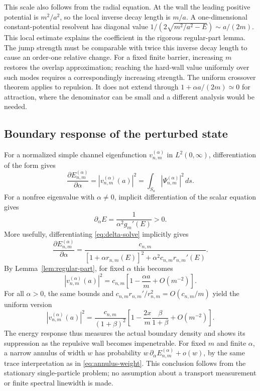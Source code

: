 \documentclass[12pt,a4paper]{article}
\numberwithin{equation}{section}
\theoremstyle{remark}
\theoremstyle{definition}
\begin{document}
This scale also follows from the radial equation. At the wall the leading
positive potential is $m^2/a^2$, so the local inverse decay length is
$m/a$. A one-dimensional constant-potential resolvent has diagonal value
$1/(2\sqrt{m^2/a^2-E})\sim a/(2m)$. This local estimate explains the
coefficient in the rigorous regular-part lemma. The jump strength must
be comparable with twice this inverse decay length to cause an order-one
relative change. For a fixed finite barrier, increasing $m$ restores the
overlap approximation; reaching the hard-wall value uniformly over such
modes requires a correspondingly increasing strength. The uniform
crossover theorem applies to repulsion. It does not extend through
$1+\alpha a/(2m)\simeq0$ for attraction, where the denominator can be
small and a different analysis would be needed.

\subsection{Boundary response of the perturbed state}

For a normalized simple channel eigenfunction $v_{n,m}^{(\alpha)}$ in
$L^2(0,\infty)$, differentiation of the form gives
\begin{equation}\label{eq:HF}
\frac{\partial E_{n,m}^{(\alpha)}}{\partial\alpha}
=|v_{n,m}^{(\alpha)}(a)|^2
=\int_{S_a}|\Psi_{n,m}^{(\alpha)}|^2\,ds.
\end{equation}
For a nonfree eigenvalue with $\alpha\ne0$, implicit differentiation of
the scalar equation gives
$$
\partial_\alpha E=\frac{1}{\alpha^2g_m'(E)}>0.
$$
More usefully, differentiating
\eqref{eq:delta-solve} implicitly gives
\begin{equation}\label{eq:boundary-response}
\frac{\partial E_{n,m}^{(\alpha)}}{\partial\alpha}
=\frac{c_{n,m}}
{[1+\alpha r_{n,m}(E)]^2+\alpha^2c_{n,m}r_{n,m}'(E)}.
\end{equation}
By Lemma~\ref{lem:regular-part}, for fixed $\alpha$ this becomes
$$
|v_{n,m}^{(\alpha)}(a)|^2
=c_{n,m}\left[1-\frac{\alpha a}{m}+O(m^{-2})\right].
$$
For all $\alpha>0$, the same bounds and
$c_{n,m}r_{n,m}'/r_{n,m}^2=O(c_{n,m}/m)$ yield the uniform version
\begin{equation}\label{eq:response-crossover}
|v_{n,m}^{(\alpha)}(a)|^2
=\frac{c_{n,m}}{(1+\beta)^2}
\left[1-\frac{2x}{m}\frac{\beta}{1+\beta}+O(m^{-2})\right].
\end{equation}
The energy response thus measures the actual boundary density and
shows its suppression as the repulsive wall becomes impenetrable.
For fixed $m$ and finite $\alpha$, a narrow annulus of width $w$ has
probability $w\,\partial_\alpha E_{n,m}^{(\alpha)}+o(w)$, by the same
trace interpretation as in \eqref{eq:annulus-weight}.
This conclusion follows from the stationary single-particle problem;
no assumption about a transport measurement or finite spectral linewidth
is made.
\end{document}
